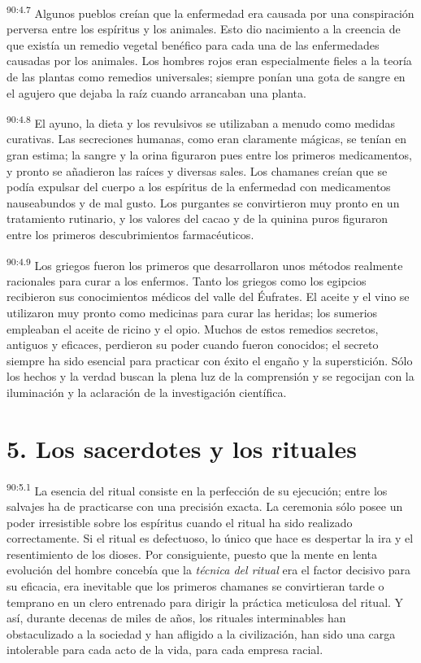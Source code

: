 \documentclass[twoside, 11pt]{book}
\begin{document}
\par
\textsuperscript{90:4.7} Algunos pueblos creían que la enfermedad era causada por una conspiración perversa entre los espíritus y los animales. Esto dio nacimiento a la creencia de que existía un remedio vegetal benéfico para cada una de las enfermedades causadas por los animales. Los hombres rojos eran especialmente fieles a la teoría de las plantas como remedios universales; siempre ponían una gota de sangre en el agujero que dejaba la raíz cuando arrancaban una planta.

\par
\textsuperscript{90:4.8} El ayuno, la dieta y los revulsivos se utilizaban a menudo como medidas curativas. Las secreciones humanas, como eran claramente mágicas, se tenían en gran estima; la sangre y la orina figuraron pues entre los primeros medicamentos, y pronto se añadieron las raíces y diversas sales. Los chamanes creían que se podía expulsar del cuerpo a los espíritus de la enfermedad con medicamentos nauseabundos y de mal gusto. Los purgantes se convirtieron muy pronto en un tratamiento rutinario, y los valores del cacao y de la quinina puros figuraron entre los primeros descubrimientos farmacéuticos.

\par
\textsuperscript{90:4.9} Los griegos fueron los primeros que desarrollaron unos métodos realmente racionales para curar a los enfermos. Tanto los griegos como los egipcios recibieron sus conocimientos médicos del valle del Éufrates. El aceite y el vino se utilizaron muy pronto como medicinas para curar las heridas; los sumerios empleaban el aceite de ricino y el opio. Muchos de estos remedios secretos, antiguos y eficaces, perdieron su poder cuando fueron conocidos; el secreto siempre ha sido esencial para practicar con éxito el engaño y la superstición. Sólo los hechos y la verdad buscan la plena luz de la comprensión y se regocijan con la iluminación y la aclaración de la investigación científica.

\section*{5. Los sacerdotes y los rituales}
\par
\textsuperscript{90:5.1} La esencia del ritual consiste en la perfección de su ejecución; entre los salvajes ha de practicarse con una precisión exacta. La ceremonia sólo posee un poder irresistible sobre los espíritus cuando el ritual ha sido realizado correctamente. Si el ritual es defectuoso, lo único que hace es despertar la ira y el resentimiento de los dioses. Por consiguiente, puesto que la mente en lenta evolución del hombre concebía que la \textit{técnica del ritual} era el factor decisivo para su eficacia, era inevitable que los primeros chamanes se convirtieran tarde o temprano en un clero entrenado para dirigir la práctica meticulosa del ritual. Y así, durante decenas de miles de años, los rituales interminables han obstaculizado a la sociedad y han afligido a la civilización, han sido una carga intolerable para cada acto de la vida, para cada empresa racial.
\end{document}
